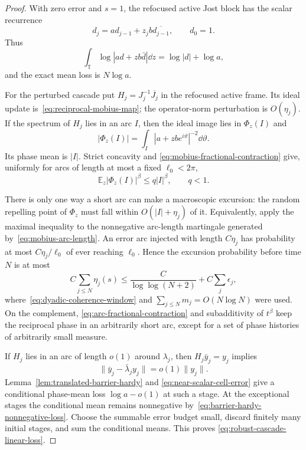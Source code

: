 \begin{proof}
With zero error and $s=1$, the refocused active Jost block has the scalar
recurrence
\begin{equation}
 d_j=a d_{j-1}+z_jb\overline{d_{j-1}},\qquad d_0=1.
 \label{eq:scalar-hyperbolic-recurrence}
\end{equation}
Thus
\begin{equation}
 \int_{\mathbb T}\log|a d+zb\bar d|\dd z
 =\log|d|+\log a,
 \label{eq:scalar-barrier-mean-gain}
\end{equation}
and the exact mean loss is $N\log a$.

For the perturbed cascade put $H_j=J_j^{-1}\overline{J_j}$ in the refocused
active frame.  Its ideal update is~\eqref{eq:reciprocal-mobius-map}; the
operator-norm perturbation is $O(\eta_j)$.  If the spectrum of $H_j$ lies in
an arc $I$, then the ideal image lies in $\Phi_z(I)$ and
\begin{equation}
 |\Phi_z(I)|=\int_I|a+zbe^{i\vartheta}|^{-2}\dd\vartheta.
 \label{eq:mobius-arc-length}
\end{equation}
Its phase mean is $|I|$.  Strict concavity and
\eqref{eq:mobius-fractional-contraction} give, uniformly for arcs of length at
most a fixed $\ell_0<2\pi$,
\begin{equation}
 \mathbb E_z|\Phi_z(I)|^\beta\leq q|I|^\beta,\qquad q<1.
 \label{eq:arc-fractional-contraction}
\end{equation}

There is only one way a short arc can make a macroscopic excursion: the random
repelling point of $\Phi_z$ must fall within $O(|I|+\eta_j)$ of it.
Equivalently, apply the maximal inequality to the nonnegative arc-length
martingale generated by~\eqref{eq:mobius-arc-length}.  An error arc injected
with length $C\eta_j$ has probability at most
$C\eta_j/\ell_0$ of ever reaching $\ell_0$.  Hence the excursion probability
before time $N$ is at most
\begin{equation}
 C\sum_{j\leq N}\eta_j(s)
 \leq \frac{C}{\log\log(N+2)}+C\sum_j\epsilon_j,
 \label{eq:mobius-excursion-probability}
\end{equation}
where~\eqref{eq:dyadic-coherence-window} and
$\sum_{j\leq N}m_j=O(N\log N)$ were used.  On the complement,
\eqref{eq:arc-fractional-contraction} and subadditivity of $t^\beta$ keep the
reciprocal phase in an arbitrarily short arc, except for a set of phase
histories of arbitrarily small measure.

If $H_j$ lies in an arc of length $o(1)$ around $\lambda_j$, then
$H_j\bar y_j=y_j$ implies
\begin{equation}
 \|\bar y_j-\bar\lambda_j y_j\|=o(1)\|y_j\|.
\end{equation}
Lemma~\ref{lem:translated-barrier-hardy} and
\eqref{eq:near-scalar-cell-error} give a conditional phase-mean loss
$\log a-o(1)$ at such a stage.  At the exceptional stages the conditional
mean remains nonnegative by~\eqref{eq:barrier-hardy-nonnegative-loss}.
Choose the summable error budget small, discard finitely many initial stages,
and sum the conditional means.  This proves
\eqref{eq:robust-cascade-linear-loss}.
\end{proof}

